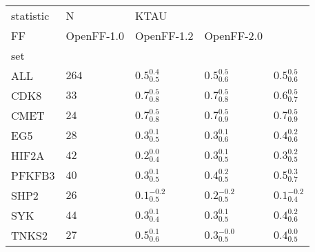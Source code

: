\begin{tabular}{lllll}
\toprule
statistic &      N & \multicolumn{3}{l}{KTAU} \\
FF &          OpenFF-1.0 &          OpenFF-1.2 &          OpenFF-2.0 \\
set    &        &                     &                     &                     \\
\midrule
ALL    &  $264$ &   $0.5^{0.4}_{0.5}$ &   $0.5^{0.5}_{0.6}$ &   $0.5^{0.5}_{0.6}$ \\
CDK8   &   $33$ &   $0.7^{0.5}_{0.8}$ &   $0.7^{0.5}_{0.8}$ &   $0.6^{0.5}_{0.7}$ \\
CMET   &   $24$ &   $0.7^{0.5}_{0.8}$ &   $0.7^{0.5}_{0.9}$ &   $0.7^{0.5}_{0.9}$ \\
EG5    &   $28$ &   $0.3^{0.1}_{0.5}$ &   $0.3^{0.1}_{0.6}$ &   $0.4^{0.2}_{0.6}$ \\
HIF2A  &   $42$ &   $0.2^{0.0}_{0.4}$ &   $0.3^{0.1}_{0.5}$ &   $0.3^{0.2}_{0.5}$ \\
PFKFB3 &   $40$ &   $0.3^{0.1}_{0.5}$ &   $0.4^{0.2}_{0.5}$ &   $0.5^{0.3}_{0.7}$ \\
SHP2   &   $26$ &  $0.1^{-0.2}_{0.5}$ &  $0.2^{-0.2}_{0.5}$ &  $0.1^{-0.2}_{0.4}$ \\
SYK    &   $44$ &   $0.3^{0.1}_{0.4}$ &   $0.3^{0.1}_{0.5}$ &   $0.4^{0.2}_{0.6}$ \\
TNKS2  &   $27$ &   $0.5^{0.1}_{0.6}$ &  $0.3^{-0.0}_{0.5}$ &   $0.4^{0.0}_{0.5}$ \\
\bottomrule
\end{tabular}
